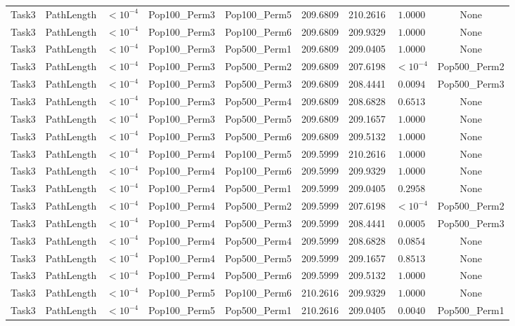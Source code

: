 \documentclass[8pt]{article}
\begin{document}
\begin{longtable}{llccccccc}
Task3 & PathLength & $< 10^{-4}$ & Pop100\_Perm3 & Pop100\_Perm5 & 209.6809 & 210.2616 & $1.0000$ & None \\
Task3 & PathLength & $< 10^{-4}$ & Pop100\_Perm3 & Pop100\_Perm6 & 209.6809 & 209.9329 & $1.0000$ & None \\
Task3 & PathLength & $< 10^{-4}$ & Pop100\_Perm3 & Pop500\_Perm1 & 209.6809 & 209.0405 & $1.0000$ & None \\
Task3 & PathLength & $< 10^{-4}$ & Pop100\_Perm3 & Pop500\_Perm2 & 209.6809 & 207.6198 & $< 10^{-4}$ & Pop500\_Perm2 \\
Task3 & PathLength & $< 10^{-4}$ & Pop100\_Perm3 & Pop500\_Perm3 & 209.6809 & 208.4441 & $0.0094$ & Pop500\_Perm3 \\
Task3 & PathLength & $< 10^{-4}$ & Pop100\_Perm3 & Pop500\_Perm4 & 209.6809 & 208.6828 & $0.6513$ & None \\
Task3 & PathLength & $< 10^{-4}$ & Pop100\_Perm3 & Pop500\_Perm5 & 209.6809 & 209.1657 & $1.0000$ & None \\
Task3 & PathLength & $< 10^{-4}$ & Pop100\_Perm3 & Pop500\_Perm6 & 209.6809 & 209.5132 & $1.0000$ & None \\
Task3 & PathLength & $< 10^{-4}$ & Pop100\_Perm4 & Pop100\_Perm5 & 209.5999 & 210.2616 & $1.0000$ & None \\
Task3 & PathLength & $< 10^{-4}$ & Pop100\_Perm4 & Pop100\_Perm6 & 209.5999 & 209.9329 & $1.0000$ & None \\
Task3 & PathLength & $< 10^{-4}$ & Pop100\_Perm4 & Pop500\_Perm1 & 209.5999 & 209.0405 & $0.2958$ & None \\
Task3 & PathLength & $< 10^{-4}$ & Pop100\_Perm4 & Pop500\_Perm2 & 209.5999 & 207.6198 & $< 10^{-4}$ & Pop500\_Perm2 \\
Task3 & PathLength & $< 10^{-4}$ & Pop100\_Perm4 & Pop500\_Perm3 & 209.5999 & 208.4441 & $0.0005$ & Pop500\_Perm3 \\
Task3 & PathLength & $< 10^{-4}$ & Pop100\_Perm4 & Pop500\_Perm4 & 209.5999 & 208.6828 & $0.0854$ & None \\
Task3 & PathLength & $< 10^{-4}$ & Pop100\_Perm4 & Pop500\_Perm5 & 209.5999 & 209.1657 & $0.8513$ & None \\
Task3 & PathLength & $< 10^{-4}$ & Pop100\_Perm4 & Pop500\_Perm6 & 209.5999 & 209.5132 & $1.0000$ & None \\
Task3 & PathLength & $< 10^{-4}$ & Pop100\_Perm5 & Pop100\_Perm6 & 210.2616 & 209.9329 & $1.0000$ & None \\
Task3 & PathLength & $< 10^{-4}$ & Pop100\_Perm5 & Pop500\_Perm1 & 210.2616 & 209.0405 & $0.0040$ & Pop500\_Perm1 \\

\end{longtable}
\end{document}
